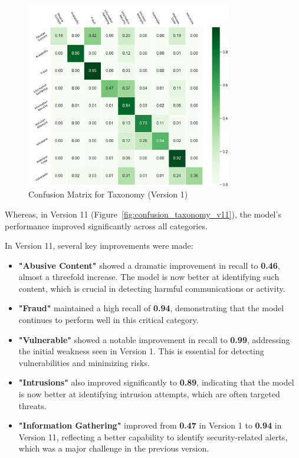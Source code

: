 \begin{figure}[h!]
    \centering
    \includegraphics[width=0.8\textwidth]{ch4/assets/v1_confusion_taxonomy.png}
    \caption{Confusion Matrix for Taxonomy (Version 1)}
    \label{fig:confusion_taxonomy_v1}
\end{figure}

Whereas, in Version 11 (Figure~\ref{fig:confusion_taxonomy_v11}), the model's performance improved significantly across all categories.

In Version 11, several key improvements were made:

\begin{itemize}
    \item \textbf{"Abusive Content"} showed a dramatic improvement in recall to \textbf{0.46}, almost a threefold increase. The model is now better at identifying such content, which is crucial in detecting harmful communications or activity.
    \item \textbf{"Fraud"} maintained a high recall of \textbf{0.94}, demonstrating that the model continues to perform well in this critical category.
    \item \textbf{"Vulnerable"} showed a notable improvement in recall to \textbf{0.99}, addressing the initial weakness seen in Version 1. This is essential for detecting vulnerabilities and minimizing risks.
    \item \textbf{"Intrusions"} also improved significantly to \textbf{0.89}, indicating that the model is now better at identifying intrusion attempts, which are often targeted threats.
    \item \textbf{"Information Gathering"} improved from \textbf{0.47} in Version 1 to \textbf{0.94} in Version 11, reflecting a better capability to identify security-related alerts, which was a major challenge in the previous version.
\end{itemize}

